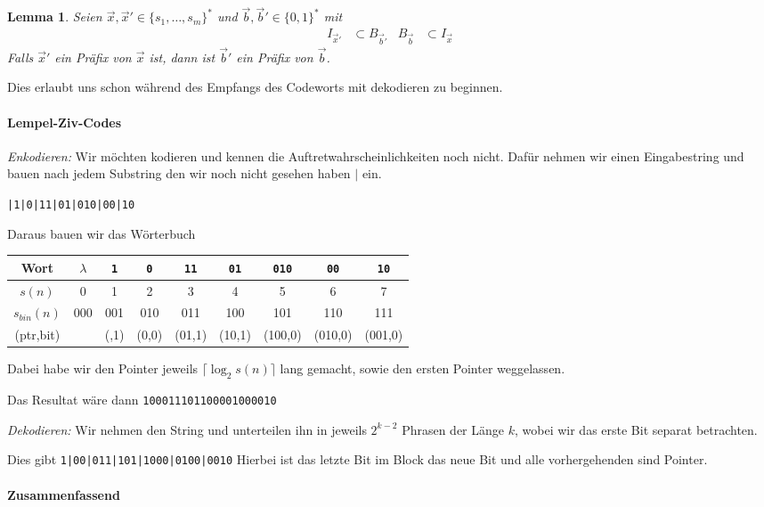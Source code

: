 \documentclass[25pt]{sciposter}
\newtheorem*{lem}{Lemma}
\begin{document}
\begin{multicols}{3}
\begin{lem}
	Seien $\vec{x}, \vec{x}' \in \{s_1,\ldots,s_m\}^*$ und $\vec{b}, \vec{b}' \in \{0,1\}^*$ mit
	\begin{align*}
		I_{\vec{x}'} &\subset B_{\vec{b}'} & B_{\vec{b}} &\subset I_{\vec{x}}
	\end{align*}
	Falls $\vec{x}'$ ein Präfix von $\vec{x}$ ist, dann ist $\vec{b}'$ ein Präfix von $\vec{b}$.
\end{lem}
Dies erlaubt uns schon während des Empfangs des Codeworts mit dekodieren zu beginnen.


\paragraph{Lempel-Ziv-Codes}
	\textit{Enkodieren:}	Wir möchten kodieren und kennen die Auftretwahrscheinlichkeiten noch nicht. Dafür nehmen wir einen Eingabestring und bauen nach jedem Substring den wir noch nicht gesehen haben $|$ ein.
	
	\texttt{|1|0|11|01|010|00|10}
	
	Daraus bauen wir das Wörterbuch
	
{
	\begin{tabular}{|c|c|c|c|c|c|c|c|c|}
	\hline
	Wort & $\lambda$ & \texttt{1} & \texttt{0}  & \texttt{11} & \texttt{01} & \texttt{010} & \texttt{00} & \texttt{10} \\
	\hline
	$s(n)$& 0 & 1 & 2 & 3 & 4 & 5 & 6 & 7 \\
	\hline
	 $s_{bin}(n)$ & 000 & 001 & 010 & 011 & 100 & 101 & 110 & 111 \\
	\hline
	(ptr,bit) & & (,1) & (0,0) & (01,1) & (10,1) & (100,0) & (010,0) & (001,0)\\ 
	\hline
\end{tabular}}
Dabei habe wir den Pointer jeweils $\lceil \log_2 s(n) \rceil$ lang gemacht, sowie den ersten Pointer weggelassen.

Das Resultat wäre dann \texttt{100011101100001000010}


\textit{Dekodieren:} Wir nehmen den String und unterteilen ihn in jeweils $2^{k-2}$ Phrasen der Länge $k$, wobei wir das erste Bit separat betrachten.

Dies gibt \texttt{1|00|011|101|1000|0100|0010}
Hierbei ist das letzte Bit im Block das neue Bit und alle vorhergehenden sind Pointer.


\paragraph{Zusammenfassend}


\end{multicols}
\end{document}
